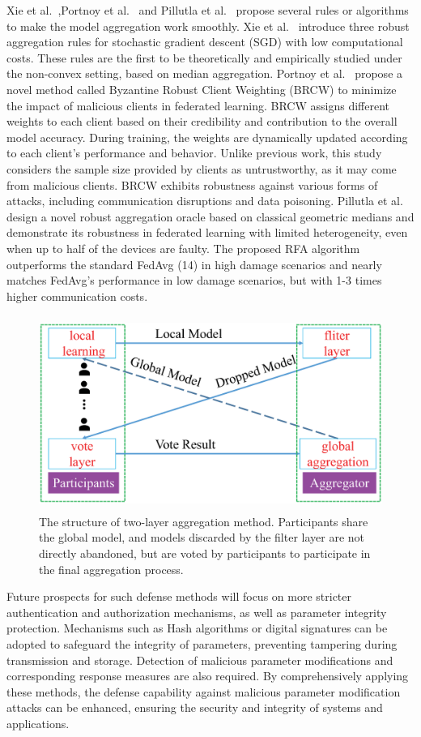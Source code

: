 Xie et al.~\cite{xie2018generalized},Portnoy et al.~\cite{portnoy2020towards} and Pillutla et
al.~\cite{pillutla2022robust} propose several rules or algorithms to make
the model aggregation work smoothly. Xie et al.~\cite{xie2018generalized}
introduce three robust aggregation rules for stochastic
gradient descent (SGD) with low computational costs.
These rules are the first to be theoretically and empirically
studied under the non-convex setting, based on median
aggregation. Portnoy et al.~\cite{portnoy2020towards} propose a novel method
called Byzantine Robust Client Weighting (BRCW) to
minimize the impact of malicious clients in federated
learning. BRCW assigns different weights to each client
based on their credibility and contribution to the overall
model accuracy. During training, the weights are
dynamically updated according to each client's performance
and behavior. Unlike previous work, this study considers
the sample size provided by clients as untrustworthy,
as it may come from malicious clients. BRCW exhibits
robustness against various forms of attacks, including
communication disruptions and data poisoning. Pillutla
et al.~\cite{pillutla2022robust} design a novel robust aggregation oracle based
on classical geometric medians and demonstrate its
robustness in federated learning with limited heterogeneity, even
when up to half of the devices are faulty. The proposed
RFA algorithm outperforms the standard FedAvg (14)
in high damage scenarios and nearly matches FedAvg's
performance in low damage scenarios, but with 1-3 times
higher communication costs. 

\begin{figure}[h]
    \centering
    \includegraphics[width=1.0\linewidth,height=2.5in]{output/fig19.eps}
     \caption{The structure of two-layer aggregation method. Participants
     share the global model, and models discarded by the filter layer are
     not directly abandoned, but are voted by participants to participate
     in the final aggregation process.}
     \label{fig19}
\end{figure}


Future prospects for such defense methods will
focus on more stricter authentication and authorization
mechanisms, as well as parameter integrity protection.
Mechanisms such as Hash algorithms or digital signatures
can be adopted to safeguard the integrity of parameters,
preventing tampering during transmission and storage.
Detection of malicious parameter modifications and
corresponding response measures are also required.
By comprehensively applying these methods, the defense capability
against malicious parameter modification attacks can be
enhanced, ensuring the security and integrity of systems
and applications.